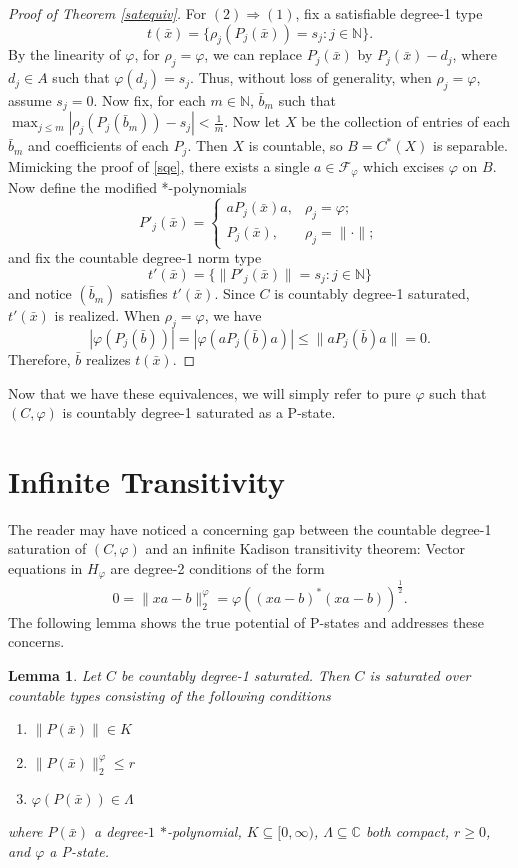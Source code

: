 \documentclass[10pt]{amsart}
\newtheorem{lem}[thm]{Lemma}
\theoremstyle{definition}
\newcommand{\Fp}{\mathscr{F}_\varphi}
\begin{document}
\begin{proof}[Proof of Theorem \ref{satequiv}]
    For $(2)\Rightarrow (1)$, fix a satisfiable degree-1 type
    \[t(\bar{x})=\{\rho_j(P_j(\bar{x}))=s_j:j\in\mathbb{N}\}.\]
    By the linearity of $\varphi$, for $\rho_j=\varphi$, we can replace $P_j(\bar{x})$ by $P_j(\bar{x})-d_j$, where $d_j\in A$ such that $\varphi(d_j)=s_j$. Thus, without loss of generality, when $\rho_j=\varphi$, assume $s_j=0$. Now fix, for each $m\in\mathbb{N}$, $\bar{b}_m$ such that $\max_{j\leq m}|\rho_j(P_j(\bar{b}_m))-s_j|<\frac{1}{m}.$
    Now let $X$ be the collection of entries of each $\bar{b}_m$ and coefficients of each $P_j$. Then $X$ is countable, so $B=C^*(X)$ is separable. Mimicking the proof of \ref{sqe}, there exists a single $a\in\Fp$ which excises $\varphi$ on $B$. Now define the modified *-polynomials 
    \[P'_j(\bar{x}) = \begin{cases} 
        aP_j(\bar{x})a, & \rho_j=\varphi; \\
        P_j(\bar{x}), & \rho_j=\|\cdot\|; 
        
   \end{cases}\]
   and fix the countable degree-$1$ norm type
   \[t'(\bar{x})=\{\|P'_j(\bar{x})\|=s_j:j\in\mathbb{N}\}\]
   and notice $(\bar{b}_m)$ satisfies $t'(\bar{x})$. 
   Since $C$ is countably degree-1 saturated, $t'(\bar{x})$ is realized. When $\rho_j=\varphi$, we have
   \[|\varphi(P_j(\bar{b}))|=|\varphi(aP_j(\bar{b})a)|\leq\|aP_j(\bar{b})a\|=0.\]
   Therefore, $\bar{b}$ realizes $t(\bar{x})$.
\end{proof}

Now that we have these equivalences, we will simply refer to pure $\varphi$ such that $(C,\varphi)$ is countably degree-1 saturated as a P-state.

\section{Infinite Transitivity}

The reader may have noticed a concerning gap between the countable degree-1 saturation of $(C,\varphi)$ and an infinite Kadison transitivity theorem: Vector equations in $H_\varphi$ are degree-2 conditions of the form 
\[0=\|xa-b\|^\varphi_2=\varphi((xa-b)^*(xa-b))^\frac{1}{2}.\] 
The following lemma shows the true potential of P-states and addresses these concerns.

\begin{lem}\label{fields}
    Let $C$ be countably degree-1 saturated. Then $C$ is saturated over countable types consisting of the following conditions
    \begin{enumerate}
        \item $\|P(\bar{x})\| \in K$
        \item $\|P(\bar{x})\|^\varphi_2 \leq r$
        \item $\varphi(P(\bar{x})) \in \Lambda$
    \end{enumerate}
    where $P(\bar{x})$ a degree-$1$ $*$-polynomial, $K\subseteq[0,\infty)$, $\Lambda\subseteq\mathbb{C}$ both compact, $r\geq 0$, and $\varphi$ a P-state.
\end{lem}
\end{document}
